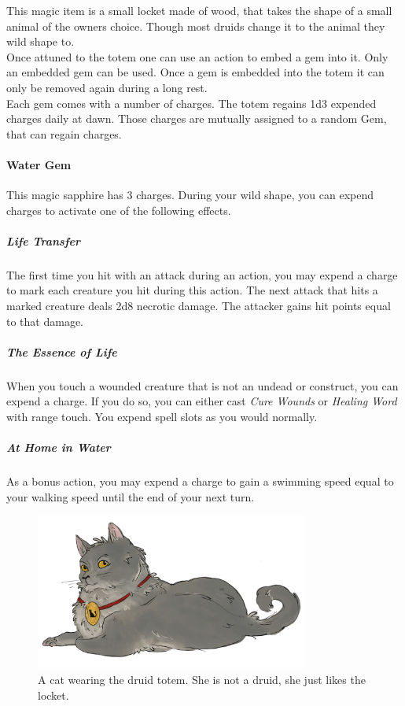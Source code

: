 \documentclass[letter,10pt,twocolumn,openany]{dndbook}
\begin{document}

This magic item is a small locket made of wood, that takes the shape of a small animal of the owners choice.
Though most druids change it to the animal they wild shape to.\\

Once attuned to the totem one can use an action to embed a gem into it.
Only an embedded gem can be used.
Once a gem is embedded into the totem it can only be removed again during a long rest.\\

Each gem comes with a number of charges.
The totem regains 1d3 expended charges daily at dawn.
Those charges are mutually assigned to a random Gem, that can regain charges.


\paragraph{Water Gem}
This magic sapphire has 3 charges.
During your wild shape, you can expend charges to activate one of the following effects.

\subparagraph{Life Transfer}
The first time you hit with an attack during an action, you may expend a charge to mark each creature you hit during this action.
The next attack that hits a marked creature deals 2d8 necrotic damage.
The attacker gains hit points equal to that damage.

\subparagraph{The Essence of Life}
When you touch a wounded creature that is not an undead or construct, you can expend a charge.
If you do so, you can either cast \textit{Cure Wounds} or \textit{Healing Word} with range touch.
You expend spell slots as you would normally.

\subparagraph{At Home in Water}
As a bonus action, you may expend a charge to gain a swimming speed equal to your walking speed until the end of your next turn.

\begin{figure}
    \includegraphics[width=9cm]{images/cat.png}
    \caption{A cat wearing the druid totem. She is not a druid, she just likes the locket.}
\end{figure}
\end{document}
